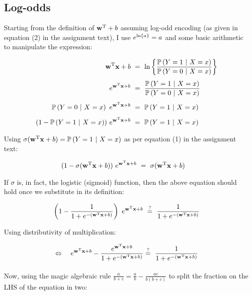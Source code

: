 \newcommand{\ea}{e^{\mbf w ^{\text{T}} \mbf x + b}}
\newcommand{\eam}{e^{-(\mbf w ^{\text{T}} \mbf x + b)}}


\subsection{Log-odds}

Starting from the definition of $\mathbf{w} ^{\text{T}} + b$ assuming log-odd
encoding (as given in equation (2) in the assignment text), I use $e^{\ln \left\{a\right\}} =
a$ and some basic arithmetic to manipulate the expression:


\begin{align*}
  \mbf w ^{\text{T}} \mbf x+ b\ &=\ \lnb{\frac{\PP{Y = 1\ |\ X = x}}{\PP{Y = 0\ |\ X =
  x}}}\\[4pt]
  e^{\mbf w ^{\text{T}}\mbf x + b}\ &=\ \frac{\PP{Y = 1\ |\ X = x}}{\PP{Y = 0\ |\ X =
  x}}\\[4pt]
  \PP{Y = 0\ |\ X = x}\ e^{\mbf w ^{\text{T}}\mbf x + b}\ &=\ \PP{Y = 1\ |\ X =
  x}\\[4pt]
   (1 - \PP{Y = 1\ |\ X = x})\ e^{\mbf w ^{\text{T}}\mbf x + b}\ &=\ \PP{Y = 1\
   |\ X = x}
\end{align*}

\noindent Using $\sigma(\mathbf{w} ^{\text{T}} \mathbf{x} + b) = \mathbb P \left(Y = 1\ |\ X = x\right)$ as per
equation (1) in the assignment text:

\begin{align*}
   (1 - \sigma(\mathbf{w} ^{\text{T}} \mathbf{x} + b))\ e^{\mathbf{w} ^{\text{T}}\mathbf{x} + b}\ &=\ \sigma(\mathbf{w} ^{\text{T}} \mathbf{x} + b)
\end{align*}

If $\sigma$ is, in fact, the logistic (sigmoid) function, then the above
equation should hold once we substitute in its definition:

\begin{align*}
  \left(1 - \frac{1}{1 + \eam}\right)\ e^{\mbf w
   ^{\text{T}}\mbf x + b}\ &\myeq\ \frac{1}{1 + \eam}\\
\end{align*}

Using distributivity of multiplication:

\begin{align*}
\Leftrightarrow\quad \ea - \frac{\ea}{1 + \eam} &\myeq \ \frac{1}{1 + \eam}\\[4pt]
\end{align*}

Now, using the magic algebraic rule $\frac{a}{b + c} = \frac{a}{b} -
\frac{ac}{b(b + c)}$ to split the fraction on the LHS of the equation in two:

